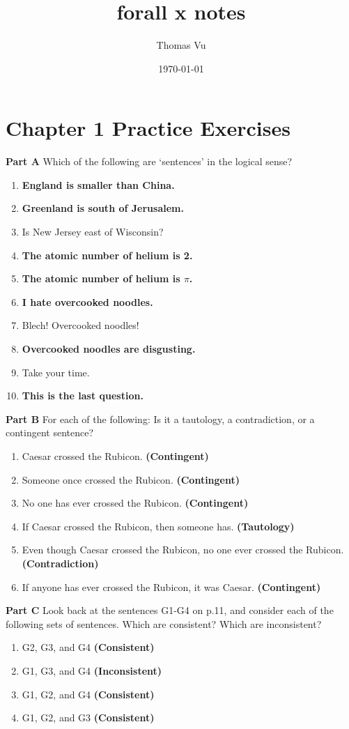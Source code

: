 \documentclass[12pt, letterpaper, twoside]{article}
\title{forall x notes} \author{Thomas Vu} \date{\today}
\begin{document}
\maketitle
\newpage
\tableofcontents
\newpage

\section{Chapter 1 Practice Exercises}
 
\textbf{Part A} Which of the following are `sentences' in
the logical sense?
\begin{enumerate}
    \item \textbf{England is smaller than China.}
    \item \textbf{Greenland is south of Jerusalem.}
    \item Is New Jersey east of Wisconsin?
    \item \textbf{The atomic number of helium is 2.}
    \item \textbf{The atomic number of helium is $\pi$.}
    \item \textbf{I hate overcooked noodles.}
    \item Blech! Overcooked noodles!
    \item \textbf{Overcooked noodles are disgusting.}
    \item Take your time.
    \item \textbf{This is the last question.}
\end{enumerate}

\noindent \textbf{Part B} For each of the following: Is it a
tautology, a contradiction, or a contingent sentence?
\begin{enumerate}
    \item Caesar crossed the Rubicon. \textbf{(Contingent)}
    \item Someone once crossed the
      Rubicon. \textbf{(Contingent)}
    \item No one has ever crossed the
      Rubicon. \textbf{(Contingent)}
    \item If Caesar crossed the Rubicon, then someone
      has. \textbf{(Tautology)}
    \item Even though Caesar crossed the Rubicon, no one
      ever crossed the Rubicon. \textbf{(Contradiction)}
    \item If anyone has ever crossed the Rubicon, it was
      Caesar. \textbf{(Contingent)}
\end{enumerate}

\noindent \textbf{Part C} Look back at the sentences G1-G4
on p.11, and consider each of the following sets of
sentences. Which are consistent? Which are inconsistent?
\begin{enumerate}
    \item G2, G3, and G4 \textbf{(Consistent)}
    \item G1, G3, and G4 \textbf{(Inconsistent)}
    \item G1, G2, and G4 \textbf{(Consistent)}
    \item G1, G2, and G3 \textbf{(Consistent)}
\end{enumerate}
\end{document}
